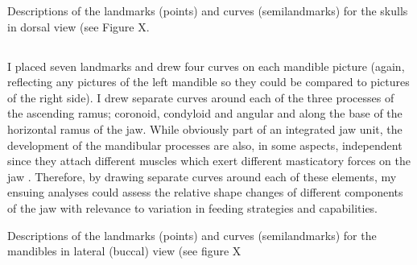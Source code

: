 \begin{table}[h]
\caption[Skulls: dorsal landmarks]
		{Descriptions of the landmarks (points) and curves (semilandmarks) for the skulls in dorsal view (see Figure X.} 

\label{tab:skdors}
\end{table}

\subsection{}
I placed seven landmarks and drew four curves on each mandible picture (again, reflecting any pictures of the left mandible so they could be compared to pictures of the right side). I drew separate curves around each of the three processes of the ascending ramus; coronoid, condyloid and angular and along the base of the horizontal ramus of the jaw. While obviously part of an integrated jaw unit, the development of the mandibular processes are also, in some aspects, independent since they attach different muscles which exert different masticatory forces on the jaw \citep{Barrow2008}. Therefore, by drawing separate curves around each of these elements, my ensuing analyses could assess the relative shape changes of different components of the jaw with relevance to variation in feeding strategies and capabilities.


\begin{table}[h]			
\centering
\caption[Mandibles' landmarks]
	{Descriptions of the landmarks (points) and curves (semilandmarks) for the mandibles in lateral (buccal) view (see figure X}

\label{mandslanddesc} %
\end{table}

\subsection{}

